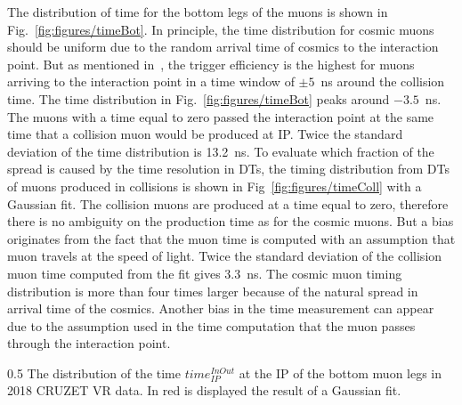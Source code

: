 The distribution of time for the bottom legs of the muons is shown in Fig.~\ref{fig:figures/timeBot}. In principle, the time distribution for cosmic muons should be uniform due to the random arrival time of cosmics to the interaction point. But as mentioned in~\cite{Chatrchyan:2009ig}, the trigger efficiency is the highest for muons arriving to the interaction point in a time window of $\pm 5$~ns around the collision time. The time distribution in Fig.~\ref{fig:figures/timeBot} peaks around $-3.5$~ns. The muons with a time equal to zero passed the interaction point at the same time that a collision muon would be produced at IP. Twice the standard deviation of the time distribution is 13.2~ns. To evaluate which fraction of the spread is caused by the time resolution in DTs, the timing distribution from DTs of muons produced in collisions is shown in Fig~\ref{fig:figures/timeColl} with a Gaussian fit. The collision muons are produced at a time equal to zero, therefore there is no ambiguity on the production time as for the cosmic muons. But a bias originates from the fact that the muon time is computed with an assumption that muon travels at the speed of light. Twice the standard deviation of the collision muon time computed from the fit gives 3.3~ns. The cosmic muon timing distribution is more than four times larger because of the natural spread in arrival time of the cosmics. Another bias in the time measurement can appear due to the assumption used in the time computation that the muon passes through the interaction point.
 

                 {0.5}       %
                 { The distribution of the time $time_{IP}^{InOut}$ at the IP of the bottom muon legs in 2018 CRUZET VR data. In red is displayed the result of a Gaussian fit.  }


